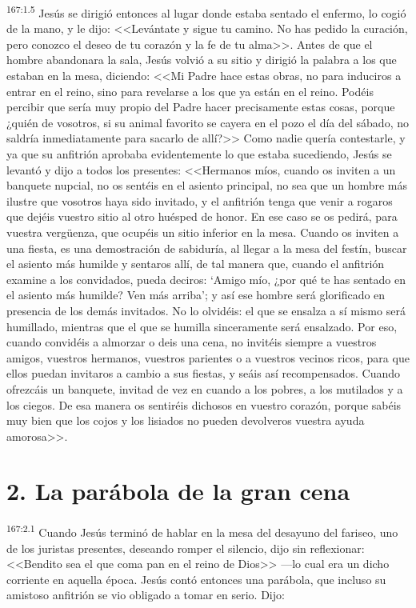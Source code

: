 \par 
\textsuperscript{167:1.5} Jesús se dirigió entonces al lugar donde estaba sentado el enfermo, lo cogió de la mano, y le dijo: <<Levántate y sigue tu camino. No has pedido la curación, pero conozco el deseo de tu corazón y la fe de tu alma>>. Antes de que el hombre abandonara la sala, Jesús volvió a su sitio y dirigió la palabra a los que estaban en la mesa, diciendo: <<Mi Padre hace estas obras, no para induciros a entrar en el reino, sino para revelarse a los que ya están en el reino. Podéis percibir que sería muy propio del Padre hacer precisamente estas cosas, porque ¿quién de vosotros, si su animal favorito se cayera en el pozo el día del sábado, no saldría inmediatamente para sacarlo de allí?>> Como nadie quería contestarle, y ya que su anfitrión aprobaba evidentemente lo que estaba sucediendo, Jesús se levantó y dijo a todos los presentes: <<Hermanos míos, cuando os inviten a un banquete nupcial, no os sentéis en el asiento principal, no sea que un hombre más ilustre que vosotros haya sido invitado, y el anfitrión tenga que venir a rogaros que dejéis vuestro sitio al otro huésped de honor. En ese caso se os pedirá, para vuestra verg\"uenza, que ocupéis un sitio inferior en la mesa. Cuando os inviten a una fiesta, es una demostración de sabiduría, al llegar a la mesa del festín, buscar el asiento más humilde y sentaros allí, de tal manera que, cuando el anfitrión examine a los convidados, pueda deciros: `Amigo mío, ¿por qué te has sentado en el asiento más humilde? Ven más arriba'; y así ese hombre será glorificado en presencia de los demás invitados. No lo olvidéis: el que se ensalza a sí mismo será humillado, mientras que el que se humilla sinceramente será ensalzado. Por eso, cuando convidéis a almorzar o deis una cena, no invitéis siempre a vuestros amigos, vuestros hermanos, vuestros parientes o a vuestros vecinos ricos, para que ellos puedan invitaros a cambio a sus fiestas, y seáis así recompensados. Cuando ofrezcáis un banquete, invitad de vez en cuando a los pobres, a los mutilados y a los ciegos. De esa manera os sentiréis dichosos en vuestro corazón, porque sabéis muy bien que los cojos y los lisiados no pueden devolveros vuestra ayuda amorosa>>.

\section*{2. La parábola de la gran cena}
\par 
\textsuperscript{167:2.1} Cuando Jesús terminó de hablar en la mesa del desayuno del fariseo, uno de los juristas presentes, deseando romper el silencio, dijo sin reflexionar: <<Bendito sea el que coma pan en el reino de Dios>> ---lo cual era un dicho corriente en aquella época. Jesús contó entonces una parábola, que incluso su amistoso anfitrión se vio obligado a tomar en serio. Dijo:


